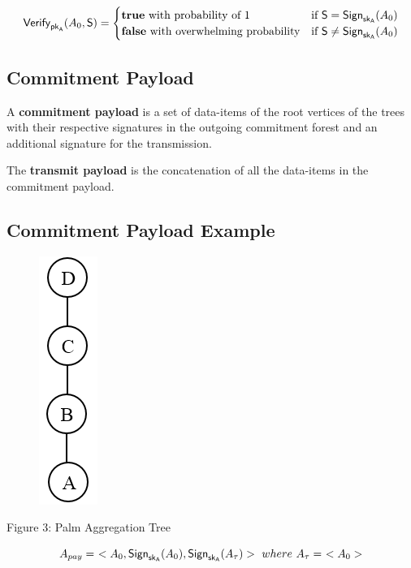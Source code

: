 \documentclass[%
  slidesonly,%
  semlayer%
  ]{seminar}                                  %
\newcommand{\sk}{\sf{sk}}
\newcommand{\pk}{\sf{pk}}
\begin{document}
\begin{slide}
      \begin{equation*}
        \textsf{Verify}_{\pk_{A}}(A_{0},\textsf{S}) = 
        \begin{cases}
         \textbf{true}\ \mbox{with probability of 1} & \mbox{if}\ \textsf{S} = \textsf{Sign}_{\sk_{A}}(A_{0})\\
         \textbf{false}\ \mbox{with overwhelming probability} & \mbox{if}\ \textsf{S} \neq \textsf{Sign}_{\sk_{A}}(A_{0})
        \end{cases}
      \end{equation*}
      \vfill
      \clearpage

    \subsection*{Commitment Payload}
      \vfill
      A \textbf{commitment payload} is a set of data-items of the root vertices of the trees with their respective signatures in the outgoing commitment forest and an additional signature for the transmission.
    
      The \textbf{transmit payload} is the concatenation of all the data-items in the commitment payload.
      \vfill
      \clearpage

    \subsection*{Commitment Payload Example}
      \vfill
      \begin{figure}[h!]
        \centering
        \includegraphics[scale = 0.4]{images/palm-aggregation-tree.png}
      \end{figure}
      \begin{center}
        Figure 3: Palm Aggregation Tree
      \end{center}
      \begin{equation*}
        A_{pay} =\ <A_{0}, \textsf{Sign}_{\sk_{A}}(A_{0}), \textsf{Sign}_{\sk_{A}}(A_{\tau}) >\ where\ A_{\tau} =\ < A_{0} > 
      \end{equation*}
      \vfill
      \clearpage


\end{slide}
\end{document}
